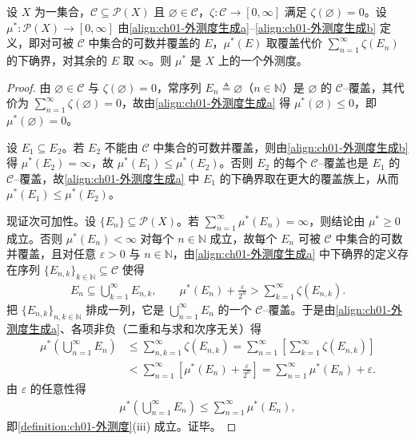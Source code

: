 \documentclass[../../main.tex]{subfiles}%
\begin{document}
\begin{theorem}\label{theorem:ch01-外测度生成}
\label{theorem:ch01-外测度}
设 $X$ 为一集合，$\mathcal{C}\subseteq\mathcal{P}(X)$ 且 $\varnothing\in\mathcal{C}$，$\zeta:\mathcal{C}\to[0,\infty]$ 满足 $\zeta(\varnothing )=0$。设 $\mu^*:\mathcal{P}(X)\to[0,\infty]$ 由\eqref{align:ch01-外测度生成a}--\eqref{align:ch01-外测度生成b} 定义，即对可被 $\mathcal{C}$ 中集合的可数并覆盖的 $E$，$\mu^*(E)$ 取覆盖代价 $\sum_{n=1}^\infty\zeta(E_n)$ 的下确界，对其余的 $E$ 取 $\infty$。则 $\mu^*$ 是 $X$ 上的一个外测度。
\end{theorem}

\begin{proof}
由 $\varnothing\in\mathcal{C}$ 与 $\zeta(\varnothing )=0$，常序列 $E_n\triangleq\varnothing$（$n\in\mathbb{N}$）是 $\varnothing$ 的 $\mathcal{C}$--覆盖，其代价为 $\sum_{n=1}^\infty\zeta(\varnothing )=0$，故由\eqref{align:ch01-外测度生成a} 得 $\mu^*(\varnothing )\leqslant 0$，即 $\mu^*(\varnothing )=0$。

设 $E_1\subseteq E_2$。若 $E_2$ 不能由 $\mathcal{C}$ 中集合的可数并覆盖，则由\eqref{align:ch01-外测度生成b} 得 $\mu^*(E_2)=\infty$，故 $\mu^*(E_1)\leqslant\mu^*(E_2)$。否则 $E_2$ 的每个 $\mathcal{C}$--覆盖也是 $E_1$ 的 $\mathcal{C}$--覆盖，故\eqref{align:ch01-外测度生成a} 中 $E_1$ 的下确界取在更大的覆盖族上，从而 $\mu^*(E_1)\leqslant\mu^*(E_2)$。

现证次可加性。设 $\{E_n\}\subseteq\mathcal{P}(X)$。若 $\sum_{n=1}^\infty\mu^*(E_n)=\infty$，则结论由 $\mu^*\geqslant 0$ 成立。否则 $\mu^*(E_n)<\infty$ 对每个 $n\in\mathbb{N}$ 成立，故每个 $E_n$ 可被 $\mathcal{C}$ 中集合的可数并覆盖，且对任意 $\varepsilon>0$ 与 $n\in\mathbb{N}$，由\eqref{align:ch01-外测度生成a} 中下确界的定义存在序列 $\{E_{n,k}\}_{k\in\mathbb{N}}\subseteq\mathcal{C}$ 使得
\begin{align*}
E_n\subseteq\bigcup_{k=1}^\infty E_{n,k},\qquad \mu^*(E_n)+\frac{\varepsilon}{2^n}>\sum_{k=1}^\infty\zeta(E_{n,k}).
\end{align*}
把 $\{E_{n,k}\}_{n,k\in\mathbb{N}}$ 排成一列，它是 $\bigcup_{n=1}^\infty E_n$ 的一个 $\mathcal{C}$--覆盖。于是由\eqref{align:ch01-外测度生成a}、各项非负（二重和与求和次序无关）得
\begin{align*}
\mu^*\left(\bigcup_{n=1}^\infty E_n\right)&\leqslant\sum_{n,k=1}^\infty\zeta(E_{n,k})=\sum_{n=1}^\infty\left[\sum_{k=1}^\infty\zeta(E_{n,k})\right]\\
&<\sum_{n=1}^\infty\left[\mu^*(E_n)+\frac{\varepsilon}{2^n}\right]=\sum_{n=1}^\infty\mu^*(E_n)+\varepsilon.
\end{align*}
由 $\varepsilon$ 的任意性得
\begin{align*}
\mu^*\left(\bigcup_{n=1}^\infty E_n\right)\leqslant\sum_{n=1}^\infty\mu^*(E_n),
\end{align*}
即\cref{definition:ch01-外测度}(iii) 成立。证毕。
\end{proof}
\end{document}
